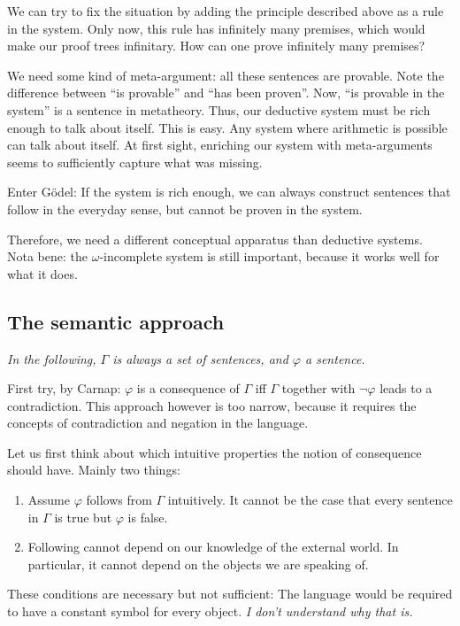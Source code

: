 \documentclass[a4paper]{article}
\begin{document}
We can try to fix the situation by adding the principle described above as a
rule in the system.  Only now, this rule has infinitely many premises, which
would make our proof trees infinitary.  How can one prove infinitely many
premises?

We need some kind of meta-argument: all these sentences are provable.  Note the
difference between ``is provable'' and ``has been proven''.  Now, ``is provable
in the system'' is a sentence in metatheory.  Thus, our deductive system must be
rich enough to talk about itself.  This is easy.  Any system where arithmetic is
possible can talk about itself.  At first sight, enriching our system with
meta-arguments seems to sufficiently capture what was missing.

Enter Gödel: If the system is rich enough, we can always construct sentences
that follow in the everyday sense, but cannot be proven in the system.

Therefore, we need a different conceptual apparatus than deductive systems.
Nota bene: the $\omega$-incomplete system is still important, because it works
well for what it does.

\subsection{The semantic approach}

\emph{In the following, $\Gamma$ is always a set of sentences, and $\varphi$ a
sentence.}

First try, by Carnap: $\varphi$ is a consequence of $\Gamma$ iff $\Gamma$
together with $\neg\varphi$ leads to a contradiction.  This approach however is
too narrow, because it requires the concepts of contradiction and negation in
the language.

Let us first think about which intuitive properties the notion of consequence
should have.  Mainly two things:
\begin{enumerate}
  \item Assume $\varphi$ follows from $\Gamma$ intuitively.  It cannot be the
  case that every sentence in $\Gamma$ is true but $\varphi$ is false.

  \item Following cannot depend on our knowledge of the external world.  In
  particular, it cannot depend on the objects we are speaking of.
\end{enumerate}
These conditions are necessary but not sufficient:  The language would be
required to have a constant symbol for every object.  \emph{I don't understand
why that is.}
\end{document}

